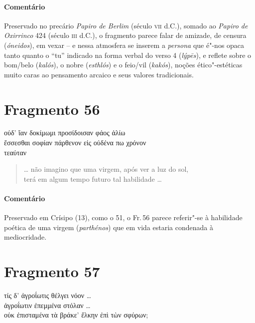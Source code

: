 \paragraph{Comentário}
Preservado no precário \textit{Papiro de Berlim} (século \textsc{vii} d.C.), somado ao \textit{Papiro de Oxirrinco} 424 (século \textsc{iii} d.C.), o fragmento parece falar de amizade, de censura (\textit{óneidos}), em vexar -- e nessa atmosfera se inserem a \textit{persona} que é"-nos opaca tanto quanto o “tu” indicado na  forma verbal do verso 4 (\textit{lýpēs}), e reflete sobre o bom/belo (\textit{kalós}), o nobre (\textit{esthlós}) e o feio/vil (\textit{kakós}), noções ético"-estéticas muito caras ao pensamento arcaico e seus valores tradicionais.



\pagebreak
\section{Fragmento 56}

\begin{gkverse}
οὐδ’ ἴαν δοκίμωμι προσίδοισαν φάος ἀλίω\\
ἔσσεσθαι σοφίαν πάρθενον εἰς οὐδένα πω χρόνον\\
τεαύταν
\end{gkverse}

\begin{verse}
\ldots{} não imagino que uma virgem, após ver a luz do sol,\\
terá em algum tempo futuro tal habilidade \ldots{}
\end{verse}

{\paragraph{Comentário} Preservado em Crísipo (13), como o 51, o Fr.\,56 parece referir"-se à habilidade
poética de uma virgem (\textit{parthénos}) que em vida estaria condenada à
mediocridade.}


\section{Fragmento 57}

\begin{gkverse}
τίς δ’ ἀγροΐωτις θέλγει νόον \ldots{}\\
ἀγροΐωτιν ἐπεμμένα στόλαν \ldots{}\\
οὐκ ἐπισταμένα τὰ βράκε’ ἔλκην ἐπὶ τὼν σφύρων;
\end{gkverse}

